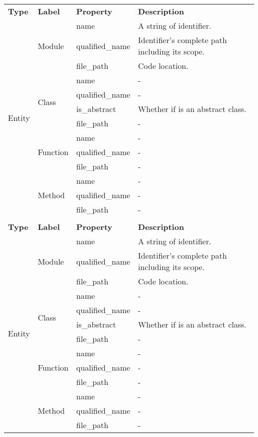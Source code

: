 \begin{tabular}{llll}
\hline
\textbf{Type} & \textbf{Label} & \textbf{Property} & \textbf{Description} \\
\cline{1-1}\cline{2-2}\cline{3-3}\cline{4-4}
\multirow{13}{*}{Entity} & \multirow{3}{*}{Module} & name & A string of identifier. \\
\cline{3-3}\cline{4-4}
 &  & qualified\_name & Identifier's complete path including its scope. \\
\cline{3-3}\cline{4-4}
 &  & file\_path & Code location. \\
\cline{2-2}\cline{3-3}\cline{4-4}
 & \multirow{4}{*}{Class} & name & - \\
\cline{3-3}\cline{4-4}
 &  & qualified\_name & - \\
\cline{3-3}\cline{4-4}
 &  & is\_abstract & Whether if is an abstract class. \\
\cline{3-3}\cline{4-4}
 &  & file\_path & - \\
\cline{2-2}\cline{3-3}\cline{4-4}
 & \multirow{3}{*}{Function} & name & - \\
\cline{3-3}\cline{4-4}
 &  & qualified\_name & - \\
\cline{3-3}\cline{4-4}
 &  & file\_path & - \\
\cline{2-2}\cline{3-3}\cline{4-4}
 & \multirow{3}{*}{Method} & name & - \\
\cline{3-3}\cline{4-4}
 &  & qualified\_name & - \\
\cline{3-3}\cline{4-4}
 &  & file\_path & - \\
\cline{1-1}\cline{2-2}\cline{3-3}\cline{4-4}
 &  &  &  \\
\cline{1-1}\cline{2-2}\cline{3-3}\cline{4-4}
\textbf{Type} & \textbf{Label} & \textbf{Property} & \textbf{Description} \\
\cline{1-1}\cline{2-2}\cline{3-3}\cline{4-4}
\multirow{13}{*}{Entity} & \multirow{3}{*}{Module} & name & A string of identifier. \\
\cline{3-3}\cline{4-4}
 &  & qualified\_name & Identifier's complete path including its scope. \\
\cline{3-3}\cline{4-4}
 &  & file\_path & Code location. \\
\cline{2-2}\cline{3-3}\cline{4-4}
 & \multirow{4}{*}{Class} & name & - \\
\cline{3-3}\cline{4-4}
 &  & qualified\_name & - \\
\cline{3-3}\cline{4-4}
 &  & is\_abstract & Whether if is an abstract class. \\
\cline{3-3}\cline{4-4}
 &  & file\_path & - \\
\cline{2-2}\cline{3-3}\cline{4-4}
 & \multirow{3}{*}{Function} & name & - \\
\cline{3-3}\cline{4-4}
 &  & qualified\_name & - \\
\cline{3-3}\cline{4-4}
 &  & file\_path & - \\
\cline{2-2}\cline{3-3}\cline{4-4}
 & \multirow{3}{*}{Method} & name & - \\
\cline{3-3}\cline{4-4}
 &  & qualified\_name & - \\
\cline{3-3}\cline{4-4}
 &  & file\_path & - \\
\cline{1-1}\cline{2-2}\cline{3-3}\cline{4-4}
\hline
\end{tabular}